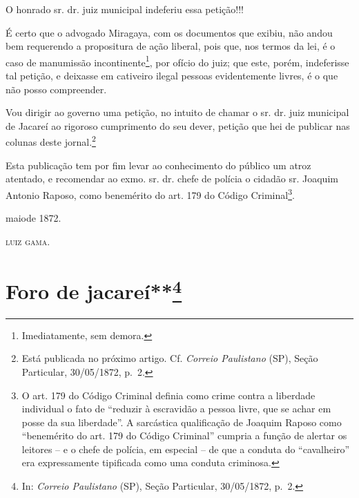 {O honrado sr. dr. juiz municipal indeferiu essa petição!!!

É certo que o advogado Miragaya, com os documentos que exibiu, não andou
bem requerendo a propositura de ação liberal, pois que, nos termos da
lei, é o caso de manumissão incontinente\footnote{ Imediatamente, sem
  demora.}, por ofício do juiz; que este, porém, indeferisse tal
petição, e deixasse em cativeiro ilegal pessoas evidentemente livres, é
o que não posso compreender.

Vou dirigir ao governo uma petição, no intuito de chamar o sr. dr. juiz
municipal de Jacareí ao rigoroso cumprimento do seu dever, petição que
hei de publicar nas colunas deste jornal.\footnote{ Está publicada no
  próximo artigo. Cf. \emph{Correio Paulistano} (SP), Seção Particular,
  30/05/1872, p.~2.}

Esta publicação tem por fim levar ao conhecimento do público um atroz
atentado, e recomendar ao exmo. sr. dr. chefe de polícia o cidadão sr.
Joaquim Antonio Raposo, como benemérito do art. 179 do Código
Criminal\footnote{ O art. 179 do Código Criminal definia como crime
  contra a liberdade individual o fato de ``reduzir à escravidão a pessoa
  livre, que se achar em posse da sua liberdade''. A sarcástica
  qualificação de Joaquim Raposo como ``benemérito do art. 179 do Código
  Criminal'' cumpria a função de alertar os leitores -- e o chefe de
  polícia, em especial -- de que a conduta do ``cavalheiro'' era
  expressamente tipificada como uma conduta criminosa.}.

maiode 1872.

\textsc{luiz gama}.

\chapter{Foro de jacareí**\footnote{ In: \emph{Correio Paulistano} (SP), Seção Particular,
  30/05/1872, p.~2.} } %

}
